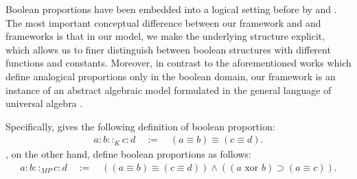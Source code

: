 \documentclass[11pt]{amsart}
\theoremstyle{definition} %
\begin{document}
Boolean proportions have been embedded into a logical setting before by  and  \cite<and see>{Lepage03}. The most important conceptual difference between our framework and  and  frameworks is that in our model, we make the underlying structure explicit, which allows us to finer distinguish between boolean structures with different functions and constants. Moreover, in contrast to the aforementioned works which define analogical proportions only in the boolean domain, our framework is an instance of an abstract algebraic model formulated in the general language of universal algebra \cite{Antic22}.

Specifically,  gives the following definition of boolean proportion:
\begin{align}\label{equ:abcd_Klein82} 
	a:b::_Kc:d \quad:=\quad (a\equiv b)\equiv (c\equiv d).
\end{align} , on the other hand, define boolean proportions as follows: 
\begin{align*} 
	a:b::_{MP}c:d \quad:=\quad ((a\equiv b)\equiv (c\equiv d))\land ((a\text{ xor }b)\supset (a\equiv c)).
\end{align*} 
\end{document}
